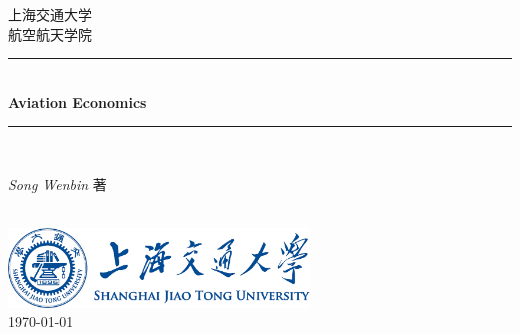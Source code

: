 \documentclass[14pt,a4paper]{ctexbook}
\begin{document}
\setcounter{secnumdepth}{3} 
\setlength{\parindent}{2em}
\setlength{}



\begin{titlepage}
\newcommand{\HRule}{\rule{\linewidth}{0.1mm}} 
\center %
 
\textsc{\Large 上海交通大学}\\[0.5cm] %
\textsc{\Large 航空航天学院}\\[0.5cm] %

 
\HRule \\[0.4cm]
{ \huge \bfseries Aviation Economics}\\[0.1cm] %
\HRule \\[1.5cm]
 
 
\begin{minipage}{0.4\textwidth}

\begin{center}
    \centering
\emph{Song Wenbin} 著 \\
\end{center}\large 

\end{minipage}\\[5cm]

\vspace*{\fill}  %
{
\includegraphics[width=0.6\textwidth]{sjtu-logo.eps} \\[1cm]
\large \today}\\[1cm] %
\vfill %
\end{titlepage}

\end{document}
